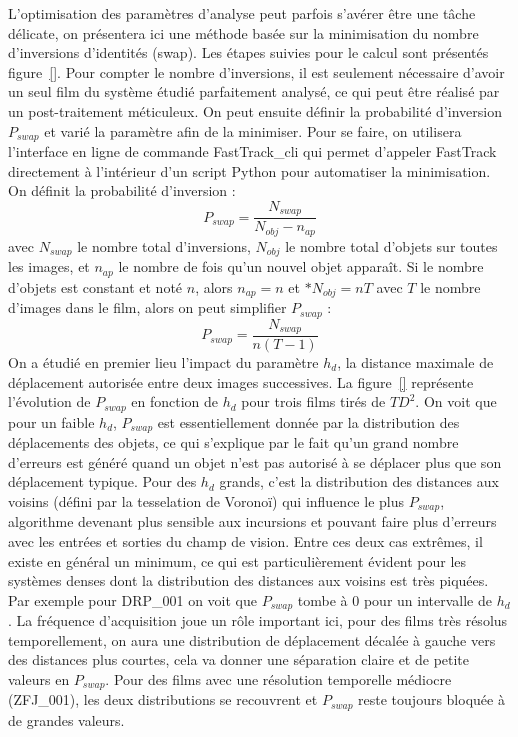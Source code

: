 	L'optimisation des paramètres d'analyse peut parfois s'avérer être une tâche délicate, on présentera ici une méthode basée sur la minimisation du nombre d'inversions d'identités (swap). Les étapes suivies pour le calcul sont présentés figure~\ref{}. Pour compter le nombre d'inversions, il est seulement nécessaire d'avoir un seul film du système étudié parfaitement analysé, ce qui peut être réalisé par un post-traitement méticuleux. On peut ensuite définir la probabilité d'inversion $P_{swap}$ et varié la paramètre afin de la minimiser. Pour se faire, on utilisera l'interface en ligne de commande FastTrack\_cli qui permet d'appeler FastTrack directement à l'intérieur d'un script Python pour automatiser la minimisation. On définit la probabilité d'inversion :
	$$
	    P_{swap}=\frac{N_{swap}}{N_{obj}-n_{ap}}
	$$
	avec $N_{swap}$ le nombre total d'inversions, $N_{obj}$ le nombre total d'objets sur toutes les images, et $n_{ap}$ le nombre de fois qu'un nouvel objet apparaît. Si le nombre d'objets est constant et noté $n$, alors $n_{ap}=n$ et $*N_{obj}=nT$ avec $T$ le nombre d'images dans le film, alors on peut simplifier $P_{swap}$ :
    $$
	    P_{swap}=\frac{N_{swap}}{n(T-1)}
	$$
	On a étudié en premier lieu l'impact du paramètre $h_d$, la distance maximale de déplacement autorisée entre deux images successives. La figure~\ref{} représente l'évolution de $P_{swap}$ en fonction de $h_d$ pour trois films tirés de $TD^2$. On voit que pour un faible $h_d$, $P_{swap}$ est essentiellement donnée par la distribution des déplacements des objets, ce qui s'explique par le fait qu'un grand nombre d'erreurs est généré quand un objet n'est pas autorisé à se déplacer plus que son déplacement typique. Pour des $h_d$ grands, c'est la distribution des distances aux voisins (défini par la tesselation de Voronoï) qui influence le plus $P_{swap}$, algorithme devenant plus sensible aux incursions et pouvant faire plus d'erreurs avec les entrées et sorties du champ de vision.
	Entre ces deux cas extrêmes, il existe en général un minimum, ce qui est particulièrement évident pour les systèmes denses dont la distribution des distances aux voisins est très piquées. Par exemple pour DRP\_001 on voit que $P_{swap}$ tombe à 0 pour un intervalle de $h_d$. La fréquence d'acquisition joue un rôle important ici, pour des films très résolus temporellement, on aura une distribution de déplacement décalée à gauche vers des distances plus courtes, cela va donner une séparation claire et de petite valeurs en $P_{swap}$. Pour des films avec une résolution temporelle médiocre (ZFJ\_001), les deux distributions se recouvrent et $P_{swap}$ reste toujours bloquée à de grandes valeurs.
\medbreak
	
